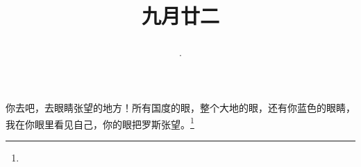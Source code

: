 \title{\date[d=24,m=10,y=2024][year:cn-y,年,month:cn,day:cn,日,·,weekday]·九月廿二 }
你去吧，去眼睛张望的地方！所有国度的眼，整个大地的眼，还有你蓝色的眼睛，我在你眼里看见自己，你的眼把罗斯张望。\footnote{ }

